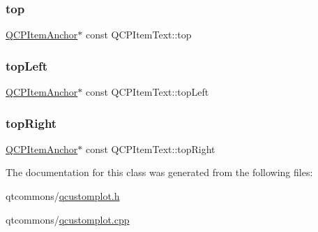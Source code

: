 \subsubsection{\texorpdfstring{top}{top}}
{\footnotesize\ttfamily \mbox{\hyperlink{class_q_c_p_item_anchor}{Q\+C\+P\+Item\+Anchor}}$\ast$ const Q\+C\+P\+Item\+Text\+::top}

\mbox{\label{class_q_c_p_item_text_a6354d8762182a3502103fabe5fbb8512}} 
\subsubsection{\texorpdfstring{topLeft}{topLeft}}
{\footnotesize\ttfamily \mbox{\hyperlink{class_q_c_p_item_anchor}{Q\+C\+P\+Item\+Anchor}}$\ast$ const Q\+C\+P\+Item\+Text\+::top\+Left}

\mbox{\label{class_q_c_p_item_text_ad18ac45cb4cc135de1eb78f2e86b6504}} 
\subsubsection{\texorpdfstring{topRight}{topRight}}
{\footnotesize\ttfamily \mbox{\hyperlink{class_q_c_p_item_anchor}{Q\+C\+P\+Item\+Anchor}}$\ast$ const Q\+C\+P\+Item\+Text\+::top\+Right}



The documentation for this class was generated from the following files\+:\begin{DoxyCompactItemize}
\item 
qtcommons/\mbox{\hyperlink{qcustomplot_8h}{qcustomplot.\+h}}\item 
qtcommons/\mbox{\hyperlink{qcustomplot_8cpp}{qcustomplot.\+cpp}}\end{DoxyCompactItemize}
